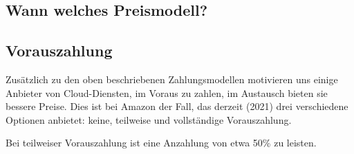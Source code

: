 \subsection{Wann welches Preismodell?}



\subsection{Vorauszahlung}
Zusätzlich zu den oben beschriebenen Zahlungsmodellen motivieren uns einige Anbieter von Cloud-Diensten, im Voraus zu zahlen, im Austausch bieten sie bessere Preise. Dies ist bei Amazon der Fall, das derzeit (2021) drei verschiedene Optionen anbietet: keine, teilweise und vollständige Vorauszahlung.

Bei teilweiser Vorauszahlung ist eine Anzahlung von etwa 50\% zu leisten.
